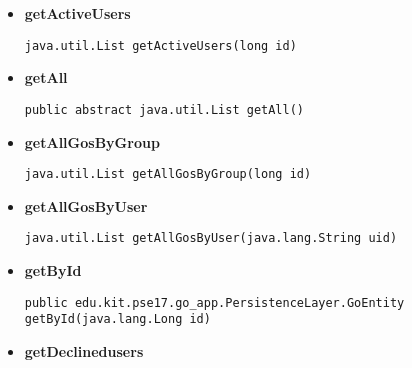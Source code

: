 \documentclass[11pt,a4paper]{report}
\begin{document}
{{{{{{{{{{{{\begin{itemize}
{\begin{lstlisting}[frame=none]
java.util.List getActiveGosByUser(java.lang.String uid)\end{lstlisting} %
}%
\item{ 
\hypertarget{edu.kit.pse17.go_app.PersistenceLayer.daos.GoDaoImp.getActiveUsers(long)}{{\bf  getActiveUsers}\\}
\begin{lstlisting}[frame=none]
java.util.List getActiveUsers(long id)\end{lstlisting} %
}%
\item{ 
\hypertarget{edu.kit.pse17.go_app.PersistenceLayer.daos.GoDaoImp.getAll()}{{\bf  getAll}\\}
\begin{lstlisting}[frame=none]
public abstract java.util.List getAll()\end{lstlisting} %
}%
\item{ 
\hypertarget{edu.kit.pse17.go_app.PersistenceLayer.daos.GoDaoImp.getAllGosByGroup(long)}{{\bf  getAllGosByGroup}\\}
\begin{lstlisting}[frame=none]
java.util.List getAllGosByGroup(long id)\end{lstlisting} %
}%
\item{ 
\hypertarget{edu.kit.pse17.go_app.PersistenceLayer.daos.GoDaoImp.getAllGosByUser(java.lang.String)}{{\bf  getAllGosByUser}\\}
\begin{lstlisting}[frame=none]
java.util.List getAllGosByUser(java.lang.String uid)\end{lstlisting} %
}%
\item{ 
\hypertarget{edu.kit.pse17.go_app.PersistenceLayer.daos.GoDaoImp.getById(java.lang.Long)}{{\bf  getById}\\}
\begin{lstlisting}[frame=none]
public edu.kit.pse17.go_app.PersistenceLayer.GoEntity getById(java.lang.Long id)\end{lstlisting} %
}%
\item{ 
\hypertarget{edu.kit.pse17.go_app.PersistenceLayer.daos.GoDaoImp.getDeclinedusers(long)}{{\bf  getDeclinedusers}\\}
\begin{lstlisting}[frame=none]

\end{lstlisting}}
\end{itemize}}}}}}}}}}}}}
\end{document}
